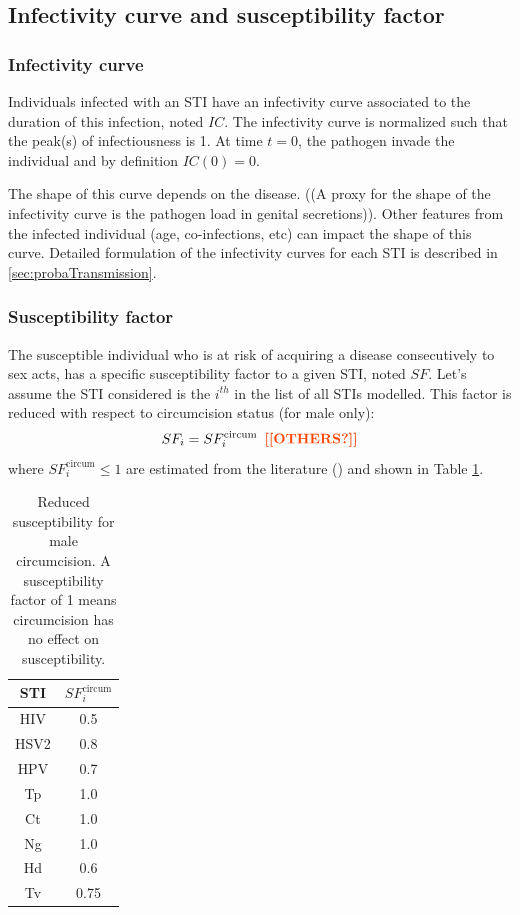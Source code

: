 \documentclass[11pt, onecolumn]{article}
\newcommand{\warning}[1]{\textbf{\textcolor{OrangeRed}{#1}}}
\begin{document}
\subsection{Infectivity curve and susceptibility factor}

\subsubsection*{Infectivity curve}
Individuals infected with an STI have an infectivity curve associated to the duration of this infection, noted $IC$. The infectivity curve is normalized such that the peak(s) of infectiousness is 1. At time $t=0$, the pathogen invade the individual and by definition $IC(0)=0$.

The shape of this curve depends on the disease. ((A proxy for the shape of the infectivity curve is the pathogen load in genital secretions)). Other features from the infected individual (age, co-infections, etc) can impact the shape of this curve. Detailed formulation of the infectivity curves for each STI is described in \ref{sec:probaTransmission}.

\subsubsection*{Susceptibility factor}
The susceptible individual who is at risk of acquiring a disease consecutively to sex acts, has a specific susceptibility factor to a given STI, noted $SF$. Let's assume the STI considered is the $i^{th}$ in the list of all STIs modelled. This factor is reduced with respect to circumcision status (for male only):
$$SF_i =SF_i^{\mathrm{circum}}  \,\,\, \warning{[[OTHERS?]]}$$
where $SF_i^{\mathrm{circum}}\leq 1$ are estimated from the literature (\cite{Weiss:2006hoa,Tobian:2009kp,Tobian:2010tr}) and shown in Table \ref{tab:circum}.

\begin{table}[htdp]
\begin{center}
\begin{tabular}{|cc|}
\hline
STI & $SF_i^{\mathrm{circum}}$\\
\hline
HIV		& 0.5 \\
HSV2	& 0.8 \\
HPV		& 0.7 \\
Tp		& 1.0 \\
Ct		& 1.0 \\
Ng		& 1.0 \\
Hd		& 0.6 \\
Tv		& 0.75 \\

\hline
\end{tabular}
\end{center}
\caption{Reduced susceptibility for male circumcision. A susceptibility factor of 1 means circumcision has no effect on susceptibility.}
\label{tab:circum}
\end{table}
\end{document}
